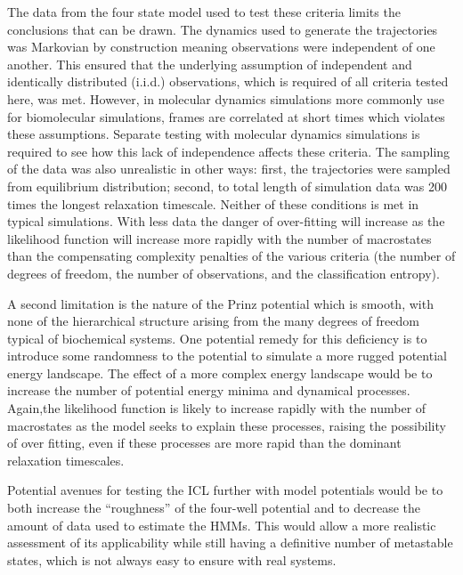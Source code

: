 The data from the four state model used to test these criteria limits the conclusions that can be drawn. The dynamics used to generate the trajectories was Markovian by construction meaning observations were independent of one another.  This ensured that the underlying assumption of independent and identically distributed  (i.i.d.) observations, which is required of all  criteria tested here, was met. However, in molecular dynamics simulations more commonly use for biomolecular simulations, frames are correlated at short times which violates these assumptions. Separate testing with molecular dynamics simulations is required to see how this lack of independence affects these criteria. The sampling of the data was also unrealistic in other ways: first, the trajectories were sampled from equilibrium distribution; second, to total length of simulation data was 200 times the longest relaxation timescale. Neither of these conditions is met in typical simulations.  With less data the danger of over-fitting will increase as the likelihood function will increase more rapidly with the number of macrostates than the compensating complexity penalties of the various criteria (the number of degrees of freedom, the number of observations, and the classification entropy). 

A second limitation is the nature of the Prinz potential which is smooth, with none of the  hierarchical structure arising from the many degrees of freedom typical of biochemical systems. One potential remedy for this deficiency is to introduce some randomness to the potential to simulate a more rugged potential energy landscape. The effect of a more complex energy landscape would be to increase the number of potential energy minima and dynamical processes. Again,the likelihood function is likely to increase rapidly with the number of macrostates as the model seeks to explain these processes, raising the possibility of over fitting, even if these processes are more rapid than the dominant relaxation timescales. 

Potential avenues for testing the ICL further with model potentials would be to both increase the ``roughness'' of the four-well potential and to decrease the amount of data used to estimate the HMMs. This would allow a more realistic assessment of its applicability while still having a definitive number of metastable states, which is not always easy to ensure with real systems. 


